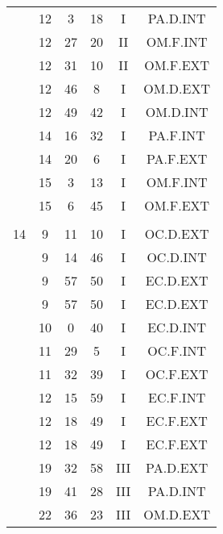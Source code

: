 \documentclass[12pt, a4paper]{article}
\begin{document}
\begin{multicols}{3}
{\begin{tabular}{c c c c c c}
	 	 	 	 & 12 & 3 & 18 & I & PA.D.INT\\%
	 	 	 	 & 12 & 27 & 20 & II & OM.F.INT\\%
	 	 	 	 & 12 & 31 & 10 & II & OM.F.EXT\\%
	 	 	 	 & 12 & 46 & 8 & I & OM.D.EXT\\%
	 	 	 	 & 12 & 49 & 42 & I & OM.D.INT\\%
	 	 	 	 & 14 & 16 & 32 & I & PA.F.INT\\%
	 	 	 	 & 14 & 20 & 6 & I & PA.F.EXT\\%
	 	 	 	 & 15 & 3 & 13 & I & OM.F.INT\\%
	 	 	 	 & 15 & 6 & 45 & I & OM.F.EXT\\%
	 	 	 	 & & & & & \\%
	 	 	 	14 & 9 & 11 & 10 & I & OC.D.EXT\\%
	 	 	 	 & 9 & 14 & 46 & I & OC.D.INT\\%
	 	 	 	 & 9 & 57 & 50 & I & EC.D.EXT\\%
	 	 	 	 & 9 & 57 & 50 & I & EC.D.EXT\\%
	 	 	 	 & 10 & 0 & 40 & I & EC.D.INT\\%
	 	 	 	 & 11 & 29 & 5 & I & OC.F.INT\\%
	 	 	 	 & 11 & 32 & 39 & I & OC.F.EXT\\%
	 	 	 	 & 12 & 15 & 59 & I & EC.F.INT\\%
	 	 	 	 & 12 & 18 & 49 & I & EC.F.EXT\\%
	 	 	 	 & 12 & 18 & 49 & I & EC.F.EXT\\%
	 	 	 	 & 19 & 32 & 58 & III & PA.D.EXT\\%
	 	 	 	 & 19 & 41 & 28 & III & PA.D.INT\\%
	 	 	 	 & 22 & 36 & 23 & III & OM.D.EXT\\%

\end{tabular}}
\end{multicols}
\end{document}
